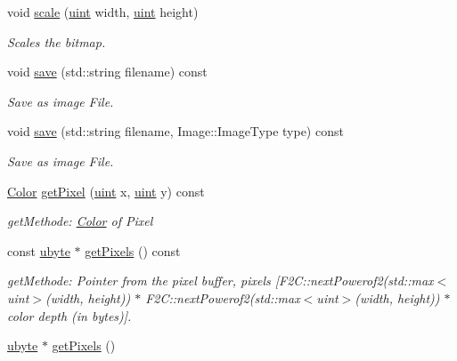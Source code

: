 \begin{DoxyCompactItemize}
void \hyperlink{class_f2_c_1_1_bitmap_aad1cdb8e6ce4ba8d5bc75123f7fee59a}{scale} (\hyperlink{namespace_f2_c_a58be2bac9eb3e3c99cb41b6008bf4fae}{uint} width, \hyperlink{namespace_f2_c_a58be2bac9eb3e3c99cb41b6008bf4fae}{uint} height)
\begin{DoxyCompactList}\small\item\em Scales the bitmap. \item\end{DoxyCompactList}\item 
void \hyperlink{class_f2_c_1_1_bitmap_af298fcc1f31a045503a0fa8ac6ff9b8b}{save} (std::string filename) const 
\begin{DoxyCompactList}\small\item\em Save as image File. \item\end{DoxyCompactList}\item 
void \hyperlink{class_f2_c_1_1_bitmap_aa31db41325bf9cf8e82c72bf407f1026}{save} (std::string filename, Image::ImageType type) const 
\begin{DoxyCompactList}\small\item\em Save as image File. \item\end{DoxyCompactList}\item 
\hyperlink{class_f2_c_1_1_color}{Color} \hyperlink{class_f2_c_1_1_bitmap_ad874bb351e5e102f2ed33deba702101f}{getPixel} (\hyperlink{namespace_f2_c_a58be2bac9eb3e3c99cb41b6008bf4fae}{uint} x, \hyperlink{namespace_f2_c_a58be2bac9eb3e3c99cb41b6008bf4fae}{uint} y) const 
\begin{DoxyCompactList}\small\item\em getMethode: \hyperlink{class_f2_c_1_1_color}{Color} of Pixel \item\end{DoxyCompactList}\item 
\hypertarget{class_f2_c_1_1_bitmap_a806f3f328dd852dfba680668ca447f42}{
const \hyperlink{namespace_f2_c_a74fad364688add30796d711e5635ac77}{ubyte} $\ast$ \hyperlink{class_f2_c_1_1_bitmap_a806f3f328dd852dfba680668ca447f42}{getPixels} () const }
\label{class_f2_c_1_1_bitmap_a806f3f328dd852dfba680668ca447f42}

\begin{DoxyCompactList}\small\item\em getMethode: Pointer from the pixel buffer, pixels \mbox{[}F2C::nextPowerof2(std::max$<$uint$>$(width, height)) $\ast$ F2C::nextPowerof2(std::max$<$uint$>$(width, height)) $\ast$ color depth (in bytes)\mbox{]}. \item\end{DoxyCompactList}\item 
\hypertarget{class_f2_c_1_1_bitmap_a2910bbe2b22ed45bacf4429a141a756a}{
\hyperlink{namespace_f2_c_a74fad364688add30796d711e5635ac77}{ubyte} $\ast$ \hyperlink{class_f2_c_1_1_bitmap_a2910bbe2b22ed45bacf4429a141a756a}{getPixels} ()}
\label{class_f2_c_1_1_bitmap_a2910bbe2b22ed45bacf4429a141a756a}


\end{DoxyCompactItemize}
